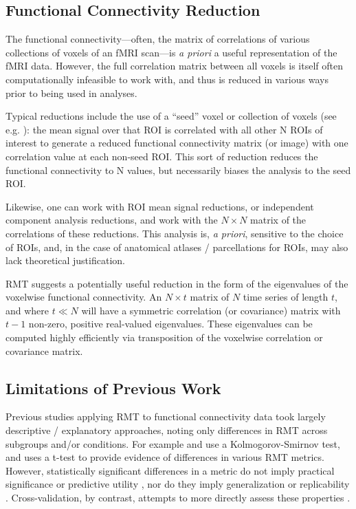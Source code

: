 \documentclass[12pt]{spieman}  %
\begin{document}
\begin{spacing}{2}
\subsection{Functional Connectivity Reduction}

The functional connectivity—often, the matrix of correlations of
various collections of voxels of an fMRI scan—is \textit{a priori} a useful
representation of the fMRI data. However, the full correlation matrix between
all voxels is itself often computationally infeasible to work with, and thus is
reduced in various ways prior to being used in analyses.

Typical reductions include the use of a ``seed'' voxel or collection of voxels
(see e.g. ): the mean signal over that ROI
is correlated with all other N ROIs of interest to generate a reduced
functional connectivity matrix (or image) with one correlation value at each
non-seed ROI. This sort of reduction reduces the functional connectivity to N
values, but necessarily biases the analysis to the seed ROI.

Likewise, one can work with ROI mean signal reductions, or independent
component analysis reductions\cite{joelRelationshipSeedbasedICAbased2011,
smithCharacterizingIndividualDifferences2014}, and work with the \(N \times N\)
matrix of the correlations of these reductions. This analysis is, \textit{a
priori}, sensitive to the choice of ROIs, and, in the case of anatomical
atlases / parcellations for ROIs, may also lack theoretical justification.

RMT suggests a potentially useful reduction in the form of the eigenvalues of
the voxelwise functional connectivity. An \(N \times t\) matrix of
\(N\) time series of length \(t\), and where \(t \ll N\) will have a symmetric
correlation (or covariance) matrix with \(t - 1\) non-zero, positive
real-valued eigenvalues. These eigenvalues can be computed highly
efficiently via transposition of the voxelwise correlation or covariance
matrix.

\subsection{Limitations of Previous Work}

Previous studies applying RMT to functional connectivity
data\cite{wangRandomMatrixTheory2016,
wangSpectralPropertiesTemporal2015a,matharooSpontaneousBackpainAlters2020,
guRandomMatrixTheory2020} took largely descriptive / explanatory approaches,
noting only differences in RMT across subgroups and/or conditions. For example
 and  use
a Kolmogorov-Smirnov test, and 
uses a t-test to provide evidence of differences in various RMT metrics.
However, statistically significant differences in a metric do not imply
practical significance or predictive utility
\cite{loWhySignificantVariables2015}, nor do they imply generalization or
replicability \cite{amrheinEarthFlat052017}. Cross-validation, by contrast,
attempts to more directly assess these properties
\cite{yarkoniChoosingPredictionExplanation2017}.


\end{spacing}
\end{document}
